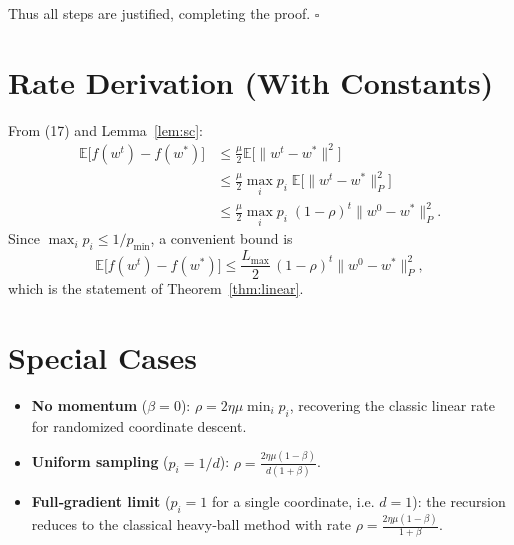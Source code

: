 \documentclass{article}
\newcommand{\E}{\mathbb{E}}
\begin{document}
Thus all steps are justified, completing the proof. \hfill $\square$

\section*{Rate Derivation (With Constants)}
From (17) and Lemma~\ref{lem:sc}:
\[
\begin{aligned}
\E\!\bigl[f(w^{t})-f(w^{*})\bigr]
&\le \frac{\mu}{2}\E\!\bigl[\|w^{t}-w^{*}\|^{2}\bigr] \\
&\le \frac{\mu}{2}\max_i p_i\;\E\!\bigl[\|w^{t}-w^{*}\|_{P}^{2}\bigr] \\
&\le \frac{\mu}{2}\max_i p_i\;(1-\rho)^{t}\|w^{0}-w^{*}\|_{P}^{2} .
\end{aligned}
\]
Since $\max_i p_i\le 1/p_{\min}$, a convenient bound is
\[
\E\!\bigl[f(w^{t})-f(w^{*})\bigr]\le
\frac{L_{\max}}{2}\,(1-\rho)^{t}\|w^{0}-w^{*}\|_{P}^{2},
\]
which is the statement of Theorem~\ref{thm:linear}.

\section*{Special Cases}
\begin{itemize}
\item \textbf{No momentum} ($\beta=0$): $\rho=2\eta\mu\min_i p_i$, recovering the classic linear rate for randomized coordinate descent.
\item \textbf{Uniform sampling} ($p_i=1/d$): $\rho=\frac{2\eta\mu(1-\beta)}{d(1+\beta)}$.
\item \textbf{Full‑gradient limit} ($p_i=1$ for a single coordinate, i.e. $d=1$): the recursion reduces to the classical heavy‑ball method with rate $\rho=\frac{2\eta\mu(1-\beta)}{1+\beta}$.
\end{itemize}
\end{document}
